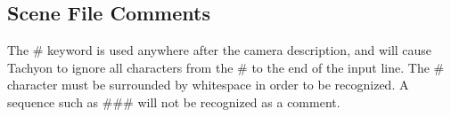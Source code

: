 \subsection{Scene File Comments}
The {\bf $\#$} keyword is used anywhere after the camera description, and 
will cause Tachyon to ignore all characters from the {\bf $\#$} to the end 
of the input line.  The {\bf $\#$} character must be surrounded by whitespace
in order to be recognized.  A sequence such as {\bf $\#\#\#$} will not be
recognized as a comment.










